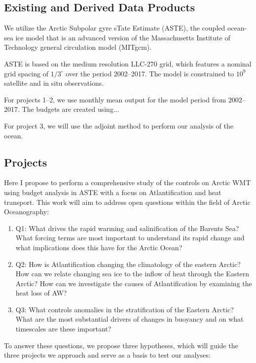 \documentclass[a4paper,12pt]{article}
\begin{document}
    \subsection{Existing and Derived Data Products}\label{ASTE}
    We utilize the Arctic Subpolar gyre sTate Estimate (ASTE), the coupled ocean-sea ice model that is an advanced version of the Massachusetts Institute of Technology general circulation model (MITgcm). 

    ASTE is based on the medium resolution LLC-270 grid, which features a nominal grid spacing of $1/3^\circ$ over the period 2002--2017. The model is constrained to $10^9$ satellite and in situ observations.

    For projects 1--2, we use monthly mean output for the model period from 2002--2017. The budgets are created using...

    For project 3, we will use the adjoint method to perform our analysis of the ocean.

    \subsection{Projects}
    Here I propose to perform a comprehensive study of the controls on Arctic WMT using budget analysis in ASTE with a focus on Atlantification and heat transport. This work will aim to address open questions within the field of Arctic Oceanography:

    \begin{enumerate}
        \item Q1: What drives the rapid warming and salinification of the Barents Sea? What forcing terms are most important to understand its rapid change and what implications does this have for the Arctic Ocean?
        \item Q2: How is Atlantification changing the climatology of the eastern Arctic? How can we relate changing sea ice to the inflow of heat through the Eastern Arctic? How can we investigate the causes of Atlantification by examining the heat loss of AW?
        \item Q3: What controls anomalies in the stratification of the Eastern Arctic? What are the most substantial drivers of changes in buoyancy and on what timescales are these important?
    \end{enumerate}

    To answer these questions, we propose three hypotheses, which will guide the three projects we approach and serve as a basis to test our analyses:
\end{document}
